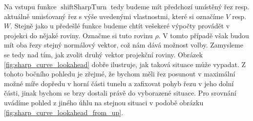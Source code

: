 Na vstupu funkce $ \operatorname{shiftSharpTurn} $ tedy budeme mít předchozí
umístěný řez resp. aktuálně umisťovaný řez s výše uvedenými vlastnostmi,
které si označíme $ V $
resp. $ W $. Stejně jako u předešlé funkce budeme chtít vešekeré výpočty provádět
v projekci do nějaké roviny. Označme si tuto rovinu $ \rho $.
V tomto případě však budou mít oba řezy stejný
normálový vektor, což nám dává možnost volby. Zamysleme se tedy nad tím,
jak zvolit druhý vektor projekční roviny. Obrázek \ref{fig:sharp_curve_lookahead}
dobře ilustruje, jak taková situace může vypadat. Z tohoto bočního pohledu je
zřejmé, že bychom měli řez posunout v maximální možné míře dopředu v horní části
tunelu a zafixovat pohyb řezu v jeho dolní části, jinak bychom se brzy dostali
právě do vyborazené situace. Pro srovnání uvádíme pohled z jiného úhlu na stejnou
situaci v podobě obrázku \ref{fig:sharp_curve_lookahead_from_up}.

